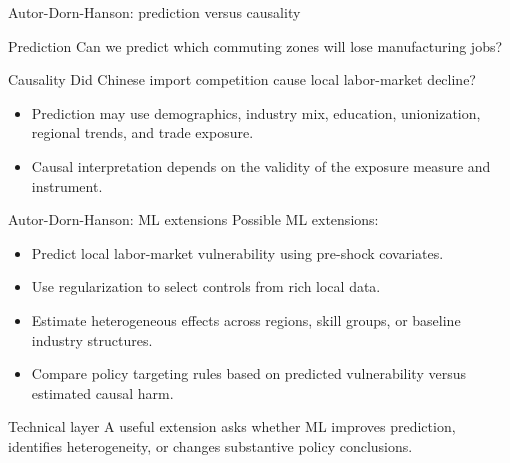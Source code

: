 \documentclass[aspectratio=169,11pt]{beamer}
\newcommand{\grad}[1]{\begin{alertblock}{Technical layer}#1\end{alertblock}}
\begin{document}
\begin{frame}{Autor-Dorn-Hanson: prediction versus causality}
\begin{block}{Prediction}
Can we predict which commuting zones will lose manufacturing jobs?
\end{block}
\begin{alertblock}{Causality}
Did Chinese import competition cause local labor-market decline?
\end{alertblock}
\begin{itemize}
  \item Prediction may use demographics, industry mix, education, unionization, regional trends, and trade exposure.
  \item Causal interpretation depends on the validity of the exposure measure and instrument.
\end{itemize}
\end{frame}

\begin{frame}{Autor-Dorn-Hanson: ML extensions}
Possible ML extensions:
\begin{itemize}
  \item Predict local labor-market vulnerability using pre-shock covariates.
  \item Use regularization to select controls from rich local data.
  \item Estimate heterogeneous effects across regions, skill groups, or baseline industry structures.
  \item Compare policy targeting rules based on predicted vulnerability versus estimated causal harm.
\end{itemize}
\grad{
A useful extension asks whether ML improves prediction, identifies heterogeneity, or changes substantive policy conclusions.
}
\end{frame}
\end{document}
